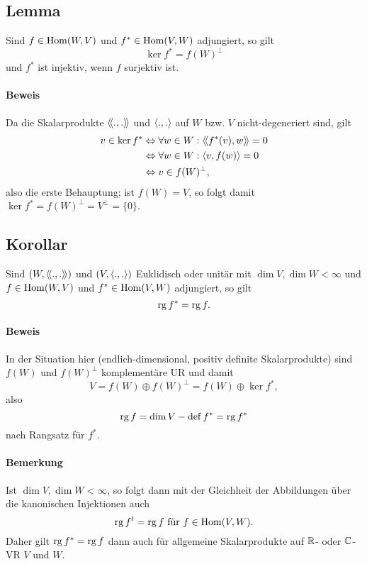 \subsection{Lemma}
\begin{Lemma}[]
	Sind $ f\in \operatorname{Hom}(W,V) $ und $ f^*\in \operatorname{Hom}(V,W) $ adjungiert, so gilt
		\[ \ker f^* = f(W)^\perp \]
	und $ f^* $ ist injektiv, wenn $ f $ surjektiv ist.
\end{Lemma}
\paragraph{Beweis}
	Da die Skalarprodukte $ \langle\! \langle .,. \rangle\! \rangle $ und $ \langle .,. \rangle $ auf $ W $ bzw. $ V $ nicht-degeneriert sind, gilt
		\begin{align*}
			v\in \ker f^* &\Leftrightarrow \forall w\in W: \langle\! \langle f^*(v),w \rangle\! \rangle = 0 \\
			&\Leftrightarrow \forall w\in W: \langle v,f(w) \rangle = 0 \\
			&\Leftrightarrow v\in f(W)^\perp,
		\end{align*}
	also die erste Behauptung; ist $ f(W)  = V$, so folgt damit $ \ker f^* = f(W)^\perp = V^\perp = \{0\} $.

\subsection{Korollar}
\begin{Korollar}[]
	Sind $ (W,\langle\! \langle .,. \rangle\! \rangle) $ und $ (V,\langle .,. \rangle) $ Euklidisch oder unitär mit $ \dim V, \dim W < \infty $ und $ f\in \operatorname{Hom}(W,V) $ und $ f^*\in \operatorname{Hom}(V,W) $ adjungiert, so gilt
		\[ \operatorname{rg} f^* = \operatorname{rg} f. \]
\end{Korollar}
\paragraph{Beweis}
	In der Situation hier (endlich-dimensional, positiv definite Skalarprodukte) sind $ f(W) $ und $ f(W)^\perp $ komplementäre UR und damit
		\[ V = f(W)\oplus f(W)^\perp = f(W)\oplus \ker f^*, \]
	also
		\[ \operatorname{rg} f = \dim V-\operatorname{def} f^* = \operatorname{rg} f^* \]
	nach Rangsatz für $ f^* $.
\paragraph{Bemerkung}
	Ist $ \dim V, \dim W <\infty $, so folgt dann mit der Gleichheit der Abbildungen über die kanonischen Injektionen auch
		\[ \operatorname{rg} f^t = \operatorname{rg} f \text{ für } f\in \operatorname{Hom}(V,W). \]
	Daher gilt $ \operatorname{rg} f^* = \operatorname{rg} f $ dann auch für allgemeine Skalarprodukte auf $ \mathbb{R} $- oder $ \mathbb{C} $-VR $ V $ und $ W $.

